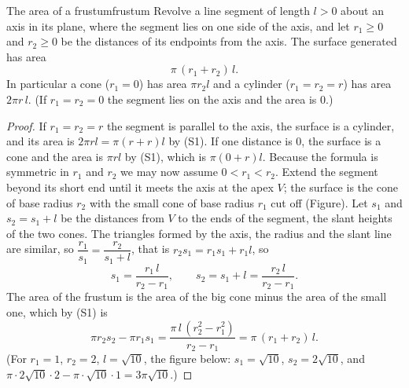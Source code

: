 \documentclass[11pt]{article}
\begin{document}
\begin{thm}{The area of a frustum}{frustum}
Revolve a line segment of length $l>0$ about an axis in its plane, where the segment lies on one side of the axis, and let $r_1\ge0$ and $r_2\ge0$ be the distances of its endpoints from the axis. The surface generated has area
\[
\pi\,(r_1+r_2)\,l .
\]
In particular a cone ($r_1=0$) has area $\pi r_2 l$ and a cylinder ($r_1=r_2=r$) has area $2\pi r\,l$. (If $r_1=r_2=0$ the segment lies on the axis and the area is $0$.)
\end{thm}
\begin{proof}
If $r_1=r_2=r$ the segment is parallel to the axis, the surface is a cylinder, and its area is $2\pi rl=\pi(r+r)l$ by (S1). If one distance is $0$, the surface is a cone and the area is $\pi rl$ by (S1), which is $\pi(0+r)l$. Because the formula is symmetric in $r_1$ and $r_2$ we may now assume $0<r_1<r_2$. Extend the segment beyond its short end until it meets the axis at the apex $V$; the surface is the cone of base radius $r_2$ with the small cone of base radius $r_1$ cut off (Figure). Let $s_1$ and $s_2=s_1+l$ be the distances from $V$ to the ends of the segment, the slant heights of the two cones. The triangles formed by the axis, the radius and the slant line are similar, so $\dfrac{r_1}{s_1}=\dfrac{r_2}{s_1+l}$, that is $r_2s_1=r_1s_1+r_1l$, so
\[
s_1=\frac{r_1\,l}{r_2-r_1},\qquad s_2=s_1+l=\frac{r_2\,l}{r_2-r_1}.
\]
The area of the frustum is the area of the big cone minus the area of the small one, which by (S1) is
\[
\pi r_2s_2-\pi r_1s_1=\frac{\pi\,l\,(r_2^2-r_1^2)}{r_2-r_1}=\pi\,(r_1+r_2)\,l .
\]
(For $r_1=1$, $r_2=2$, $l=\sqrt{10}$, the figure below: $s_1=\sqrt{10}$, $s_2=2\sqrt{10}$, and $\pi\cdot2\sqrt{10}\cdot2-\pi\cdot\sqrt{10}\cdot1=3\pi\sqrt{10}$.)
\end{proof}
\end{document}
